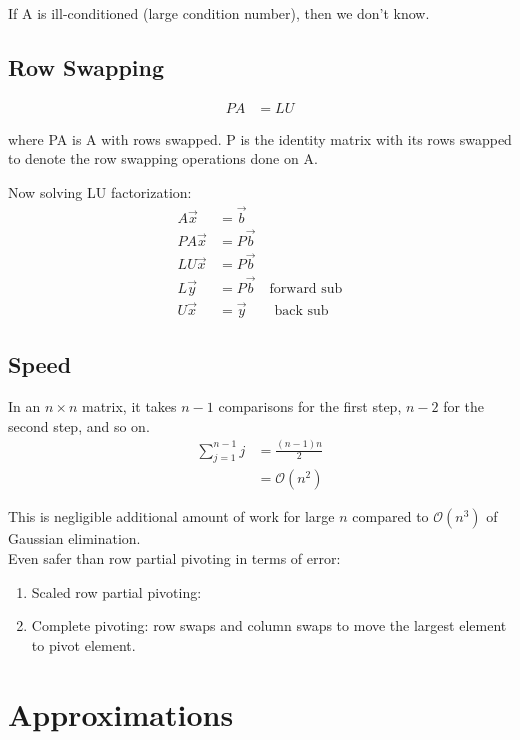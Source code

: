 \documentclass[12pt, letterpaper]{article}
\begin{document}
If A is ill-conditioned (large condition number), then we don't know.

\subsection{Row Swapping}
\begin{align*}    
    PA &= LU
\end{align*}
\begin{center}
    where PA is A with rows swapped. P is the identity matrix with its rows swapped to denote the row swapping operations done on A. 
\end{center}

\noindent Now solving LU factorization:
\begin{align*}
    A\vec x &= \vec b \\
    PA\vec x &= P\vec b \\
    LU\vec x &= P\vec b \\ 
    L\vec y &= P\vec b \quad \text{forward sub}\\
    U\vec x &= \vec y \qquad \text{back sub}
\end{align*}

\subsection{Speed}

\noindent In an $n\times n $ matrix, it takes $n-1$ comparisons for the first step, $n-2$ for the second step, and so on.
\begin{align*}
    \sum_{j=1}^{n-1}j &= \frac{(n-1)n}{2} \\
    &= \mathcal{O}(n^2)
\end{align*}

\noindent This is negligible additional amount of work for large $n$ compared to $\mathcal{O}(n^3)$ of Gaussian elimination. \\

\noindent Even safer than row partial pivoting in terms of error:
\begin{enumerate}
    \item Scaled row partial pivoting: 
    \item Complete pivoting: row swaps and column swaps to move the largest element to pivot element.
\end{enumerate}

\section{Approximations}
\end{document}

